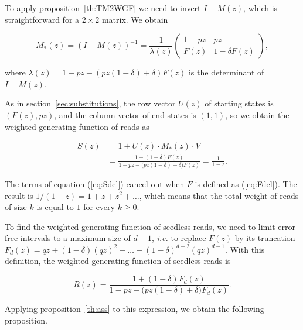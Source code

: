 \documentclass{article}
\begin{document}
To apply proposition~\ref{th:TM2WGF} we need to invert $I-M(z)$, which is
straightforward for a $2 \times 2$ matrix. We obtain

\begin{equation*}
M_*(z) = (I-M(z))^{-1}=
\frac{1}{\lambda(z)}
\left(
\begin{matrix}
1-pz  & pz              \\
F(z) & 1 -\delta F(z)
\end{matrix}
\right),
\end{equation*}

\noindent
where $\lambda(z) = 1-pz-(pz(1-\delta)+\delta)F(z)$ is the determinant of
$I-M(z)$.

As in section~\ref{sec:substitutions}, the row vector $U(z)$ of starting
states is $(F(z), pz)$, and the column vector of end states is $(1,1)$, so
we obtain the weighted generating function of reads as

\begin{equation}
\label{eq:Sdel}
\begin{split}
S(z) &= 1 + U(z) \cdot M_*(z) \cdot V \\
&= \frac{1+(1-\delta)F(z)} {1-pz - \big(pz(1-\delta) + \delta\big)F(z)}
= \frac{1}{1-z}.
\end{split}
\end{equation}

The terms of equation (\ref{eq:Sdel}) cancel out when $F$ is defined as
(\ref{eq:Fdel}). The result is $1/(1-z) = 1+z +z^2 + \ldots$, which means
that the total weight of reads of size $k$ is equal to $1$ for every $k
\geq 0$.

To find the weighted generating function of seedless reads, we need to
limit error-free intervals to a maximum size of $d-1$, \textit{i.e.} to
replace $F(z)$ by its truncation $F_d(z) = qz + (1-\delta)(qz)^2 + \ldots
+ (1-\delta)^{d-2}(qz)^{d-1}$. With this definition, the weighted
generating function of seedless reads is

\begin{equation}
\label{eq:Sdel}
R(z) = \frac{1+(1-\delta)F_d(z)}
  {1-pz - \big(pz(1-\delta) + \delta\big)F_d(z)}.
\end{equation}

Applying proposition~\ref{th:ass} to this expression, we obtain the
following proposition.
\end{document}
